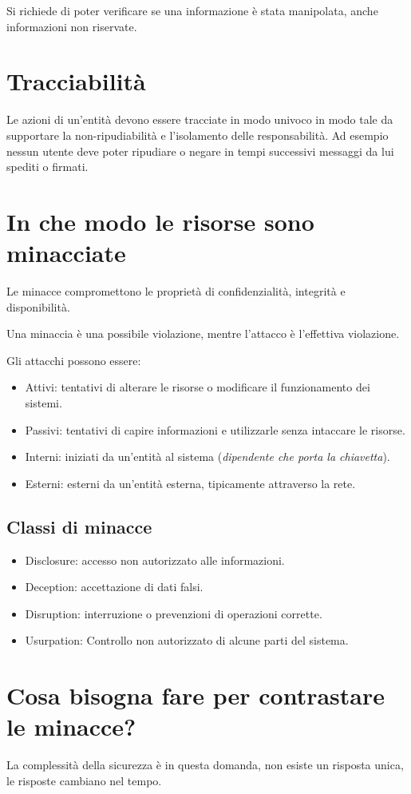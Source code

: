 \documentclass[oneside,a4paper,11pt]{book}
\theoremstyle{italicstyle}
\theoremstyle{normStyle}
\begin{document}
Si richiede di poter verificare se una informazione è stata manipolata, anche informazioni non riservate.
\section{Tracciabilità}
Le azioni di un'entità devono essere tracciate in modo univoco in modo tale da supportare 
la non-ripudiabilità e l’isolamento delle responsabilità.
Ad esempio nessun utente deve poter ripudiare o negare in tempi 
successivi messaggi da lui spediti o firmati.
\section{In che modo le risorse sono minacciate}
Le minacce compromettono le proprietà di confidenzialità, integrità e disponibilità.

Una minaccia è una possibile violazione, mentre l'attacco è l'effettiva violazione.

Gli attacchi possono essere:
\begin{itemize}
  \item Attivi: tentativi di alterare le risorse o modificare il funzionamento dei sistemi.
  \item Passivi: tentativi di capire informazioni e utilizzarle senza intaccare le risorse.
  \item Interni: iniziati da un'entità al sistema (\textit{dipendente che porta la chiavetta}).
  \item Esterni: esterni da un'entità esterna, tipicamente attraverso la rete.
\end{itemize}
\subsection{Classi di minacce}
\begin{itemize}
  \item Disclosure: accesso non autorizzato alle informazioni.
  \item Deception: accettazione di dati falsi.
  \item Disruption: interruzione o prevenzioni di operazioni corrette.
  \item Usurpation: Controllo non autorizzato di alcune parti del sistema.
\end{itemize}
\section{Cosa bisogna fare per contrastare le minacce?}
La complessità della sicurezza è in questa domanda, non esiste un risposta 
unica, le risposte cambiano nel tempo.
\end{document}
